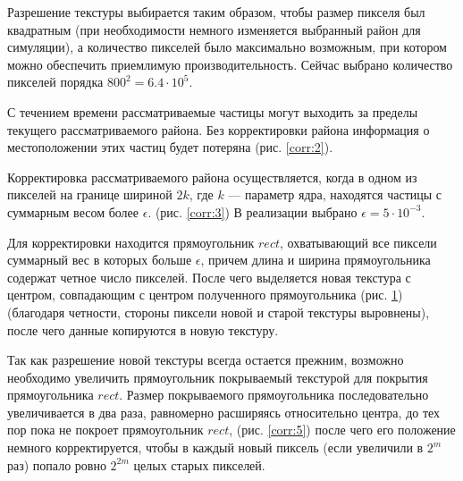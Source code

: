 Разрешение текстуры выбирается таким образом, чтобы размер пикселя был квадратным
(при необходимости немного изменяется выбранный район для симуляции), а количество пикселей
было максимально возможным, при котором можно обеспечить приемлимую производительность.
Сейчас выбрано количество пикселей порядка $800^2 = 6.4 \cdot 10^5$.

С течением времени рассматриваемые частицы могут выходить за пределы текущего рассматриваемого
района. Без корректировки района информация о местоположении этих частиц будет потеряна
(рис. \ref{corr:2}).

\begin{figure}[ht]
  \centering
\begin{minipage}[t]{.48\textwidth}
  \centering
  \label{corr:3}
\end{minipage}
\begin{minipage}[t]{.48\textwidth}
  \centering
  \label{corr:4}
\end{minipage}
\end{figure}

Корректировка рассматриваемого района осуществляется, когда в одном из пикселей на границе
шириной $2k$, где $k$ --- параметр ядра, находятся частицы с суммарным весом более $\epsilon$.
(рис. \ref{corr:3}) В реализации выбрано $\epsilon = 5 \cdot 10^{-3}$.

Для корректировки находится прямоугольник $rect$, охватывающий все пиксели суммарный вес в которых
больше $\epsilon$, причем длина и ширина прямоугольника содержат четное число пикселей.
После чего выделяется новая текстура с центром, совпадающим с центром полученного прямоугольника
(рис. \ref{corr:4}) (благодаря четности, стороны пиксели новой и старой текстуры выровнены), 
после чего данные копируются в новую текстуру.

Так как разрешение новой текстуры всегда остается прежним, возможно необходимо увеличить
прямоугольник покрываемый текстурой для покрытия прямоугольника $rect$. Размер покрываемого
прямоугольника последовательно увеличивается в два раза, равномерно расширяясь относительно центра,
до тех пор пока не покроет прямоугольник $rect$, (рис. \ref{corr:5}) после чего его положение
немного корректируется, чтобы в каждый новый пиксель (если увеличили в $2^m$ раз) попало ровно
$2^{2m}$ целых старых пикселей.

